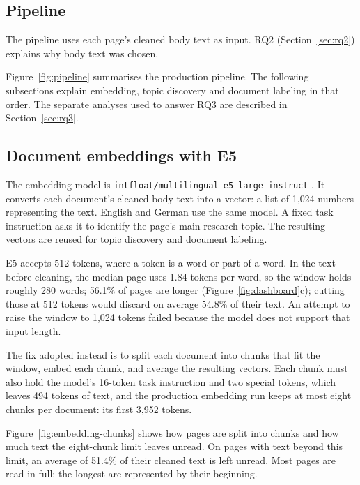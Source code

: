 \subsection{Pipeline}
\label{sec:method-pipeline}

The pipeline uses each page's cleaned body text as input. RQ2 (Section~\ref{sec:rq2}) explains
why body text was chosen.

Figure~\ref{fig:pipeline} summarises the production pipeline. The following subsections explain
embedding, topic discovery and document labeling in that order. The separate analyses used to
answer RQ3 are described in Section~\ref{sec:rq3}.



\subsection{Document embeddings with E5}
\label{sec:method-embed}

The embedding model is \texttt{intfloat/}\allowbreak\texttt{multilingual-e5-large-instruct}
\cite{wang2024multilingual}. It converts each document's cleaned body text into a vector: a
list of 1{,}024 numbers representing the text. English and German use the same model. A fixed
task instruction asks it to identify the page's main research topic. The resulting vectors are
reused for topic discovery and document labeling.

E5 accepts 512 tokens, where a token is a word or part of a word. \measured{} In the
text before cleaning, the median page uses 1.84 tokens per word, so the window holds roughly 280
words; 56.1\% of pages are longer (Figure~\ref{fig:dashboard}c);
cutting those at 512 tokens would discard on average 54.8\% of their text. An attempt to raise the
window to 1{,}024 tokens failed because the model does not support that input length.

The fix adopted instead is to split each document into chunks that fit the window, embed
each chunk, and average the resulting vectors. Each chunk must also hold the model's 16-token task
instruction and two special tokens, which leaves 494 tokens of text, and the production embedding run keeps
at most eight chunks per document: its first 3{,}952 tokens.

Figure~\ref{fig:embedding-chunks} shows how pages are split into chunks and how much text the
eight-chunk limit leaves unread.
\measured{} On pages with text beyond this limit, an average of 51.4\% of their cleaned text
is left unread.
Most pages are read in full; the longest are represented by their beginning.

